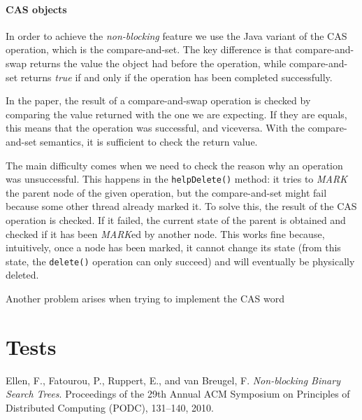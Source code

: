 \documentclass[a4paper,draft,12pt]{article}
\begin{document}
\paragraph{CAS objects}
In order to achieve the \emph{non-blocking} feature we use the Java variant of the \ac{CAS} operation, which is the compare-and-set.
The key difference is that compare-and-swap returns the value the object had before the operation, while compare-and-set returns \emph{true} if and only if the operation has been completed successfully.

In the paper, the result of a compare-and-swap operation is checked by comparing the value returned with the one we are expecting. If they are equals, this means that the operation was successful, and viceversa.
With the compare-and-set semantics, it is sufficient to check the return value.

The main difficulty comes when we need to check the reason why an operation was unsuccessful.
This happens in the \texttt{helpDelete()} method: it tries to \emph{MARK} the parent node of the given operation, but the compare-and-set might fail because some other thread already marked it.
To solve this, the result of the \ac{CAS} operation is checked. If it failed, the current state of the parent is obtained and checked if it has been \emph{MARK}ed by another node.
This works fine because, intuitively, once a node has been marked, it cannot change its state (from this state, the \texttt{delete()} operation can only succeed) and will eventually be physically deleted.

Another problem arises when trying to implement the CAS word

\section{Tests} %
\label{sec:tests}



\begin{thebibliography}{9}
     Ellen, F., Fatourou, P., Ruppert, E., and van Breugel, F. \emph{Non-blocking Binary Search Trees}. Proceedings of the 29th Annual ACM Symposium on Principles of Distributed Computing (PODC), 131–140, 2010.
\end{thebibliography}
\end{document}
